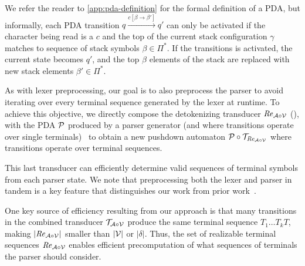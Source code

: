 We refer the reader to \autoref{app:pda-definition} for the formal definition of a PDA, but informally, each PDA transition $q \xrightarrow{c[\beta \rightarrow \beta']} q'$ can only be activated if the character being read is a $c$ and the top of the current stack configuration $\gamma$ matches to sequence of stack symbols $\beta \in \Pi^\ast$. 
If the transitions is activated, the current state becomes $q'$, and the top $\beta$ elements of the stack are replaced with new stack elements $\beta' \in \Pi^\ast$.

As with lexer preprocessing, our goal is to also preprocess the parser to avoid iterating over every terminal sequence generated by the lexer at runtime.
To achieve this objective, we
directly compose the detokenizing transducer $\mathit{Re}_{\mathcal{A} \circ \mathcal{V}}$ (), with the PDA $\mathcal{P}$ produced by a parser generator (and where transitions operate over single terminals)~\cite{allauzen2012pushdown} to obtain a new pushdown automaton $\mathcal{P} \circ \mathcal{T}_{\mathit{Re}_{\mathcal{A} \circ \mathcal{V}}}$ where transitions operate over terminal sequences. 

This last transducer can efficiently determine valid sequences of terminal symbols from each parser state.
% 
We note that preprocessing both the lexer and parser in tandem is a key feature that distinguishes our work from prior work~\cite{beurer2024domino, ugare2024syncode}.

One key source of efficiency resulting from our approach is that many transitions in the combined transducer $\mathcal{T}_{\mathcal{A} \circ 
 \mathcal{V}}$ produce the same terminal sequence $T_1 \ldots T_k T$, making $|\mathit{Re}_{\mathcal{A} \circ \mathcal{V}}|$ smaller than $|\mathcal{V}|$ or $|\delta|$.
%
Thus, the set of realizable terminal sequences $\mathit{Re}_{\mathcal{A} \circ \mathcal{V}}$ enables efficient precomputation of what sequences of terminals the parser should consider.

